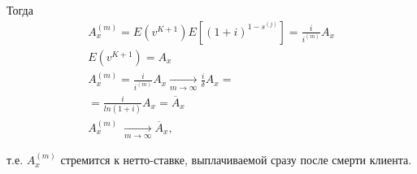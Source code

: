 \begin{itemize}
	Тогда 
	\begin{gather*}
		A_x^{(m)} = E(v^{K+1})E[(1+i)^{1-s^{(j)}}] = \frac{i}{i^{(m)}}A_x\\
		E(v^{K+1}) = A_x\\
		A_x^{(m)} = \frac{i}{i^{(m)}}A_x \xrightarrow[m\rightarrow\infty]{}\frac{i}{\delta}A_x=\\
		=\frac{i}{ln(1+i)}A_x = \overline{A}_x\\
		A_x^{(m)} \;\xrightarrow[m\rightarrow\infty]{}\overline{A}_x,
	\end{gather*}

	т.е. $ A_x^{(m)}$ стремится к нетто-ставке, выплачиваемой сразу после смерти клиента.
\end{itemize}


